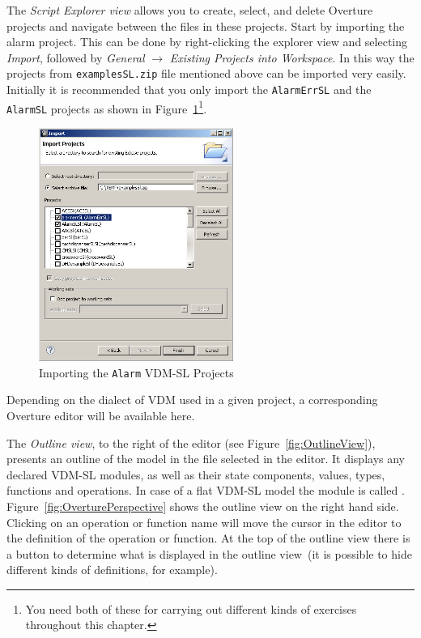 {The \emph{Script Explorer view} allows you to create, select, and
delete Overture projects and navigate between the files in these
projects. Start by importing the alarm project. This can be done by
right-clicking the explorer view and selecting \emph{Import}, followed
by \emph{General} $\rightarrow$ \emph{Existing Projects into
  Workspace}.  In this way the projects from \texttt{examplesSL.zip} file
mentioned above can be imported very easily. Initially it is
recommended that you only import the \texttt{AlarmErrSL} and the
\texttt{AlarmSL} projects as shown in
Figure~\ref{fig:importalarm}\footnote{You need both of these for
  carrying out different kinds of exercises throughout this chapter.}.

\begin{figure}[!htb]
\begin{center}
  \includegraphics[width=2.5in]{figures/importalarm}
  \caption[labelInTOC]{Importing the \texttt{Alarm} VDM-SL Projects}
  \label{fig:importalarm}
\end{center}
\end{figure}

Depending on the dialect of VDM used in a given project, a
corresponding Overture editor will be available here. 

The \emph{Outline view}, to the right of the editor (see
Figure~\ref{fig:OutlineView}), presents an outline of the
model in the file selected in the editor. It displays any declared
VDM-SL modules, as well as their state components, values, types,
functions and operations. In case of a flat VDM-SL model the module is
called {}.
Figure~\ref{fig:OverturePerspective} shows the outline view
on the right hand side. Clicking on an operation or function name will
move the cursor in the editor to the definition of the operation or function. At
the top of the outline view there is a button to determine what is
displayed in the outline view~(it is possible to hide different kinds
of definitions, for
example).

}
